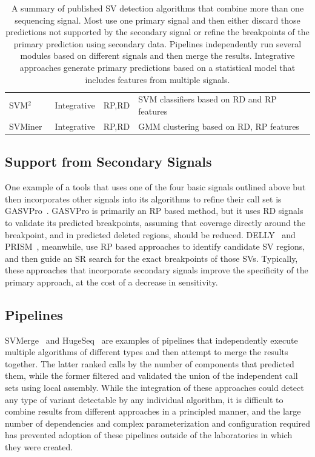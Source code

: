 \begin{table}
\begin{center}
{\begin{tabular}{llll}
SVM$^2$~\cite{Chiara:2012ey}    &       Integrative     &       RP,RD   &       SVM classifiers based on RD and RP features \\
SVMiner~\cite{Hayes:2012ia}	&	Integrative	&	RP,RD	&	GMM clustering based on RD, RP features	\\
\hline
\end{tabular}
}
\end{center}
\caption{A summary of published SV detection algorithms that combine more than one sequencing signal. Most use one primary signal and then either discard those predictions not supported by the secondary signal or refine the breakpoints of the primary prediction using secondary data. Pipelines independently run several modules based on different signals and then merge the results. Integrative approaches generate primary predictions based on a statistical model that includes features from multiple signals.}
\label{table_hybrid_sv_approaches}
\end{table}

\subsection{Support from Secondary Signals}

One example of a tools that uses one of the four basic signals outlined above but then incorporates other signals into its algorithms to refine their call set is GASVPro~\cite{Sindi:2012kk}. GASVPro is primarily an RP based method, but it uses RD signals to validate its predicted breakpoints, assuming that coverage directly around the breakpoint, and in predicted deleted regions, should be reduced. DELLY~\cite{Rausch:2012he} and PRISM~\cite{Jiang:2012cp}, meanwhile, use RP based approaches to identify candidate SV regions, and then guide an SR search for the exact breakpoints of those SVs. Typically, these approaches that incorporate secondary signals improve the specificity of the primary approach, at the cost of a decrease in sensitivity.
 
\subsection{Pipelines}

SVMerge~\cite{Wong:2010p1271} and HugeSeq~\cite{Lam:2012jy} are examples of pipelines that independently execute multiple algorithms of different types and then attempt to merge the results together. The latter ranked calls by the number of components that predicted them, while the former filtered and validated the union of the independent call sets using local assembly. While the integration of these approaches could detect any type of variant detectable by any individual algorithm, it is difficult to combine results from different approaches in a principled manner, and the large number of dependencies and complex parameterization and configuration required has prevented adoption of these pipelines outside of the laboratories in which they were created.

